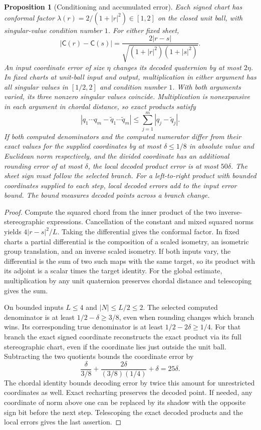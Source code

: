 \documentclass[11pt,reqno]{amsart}
\newtheorem{proposition}[theorem]{Proposition}
\theoremstyle{definition}
\theoremstyle{remark}
\numberwithin{equation}{section}
\newcommand{\Cay}{\mathsf{C}}
\begin{document}
\begin{proposition}[Conditioning and accumulated error]\label{m4:conditioning}
Each signed chart has conformal factor $\lambda(r)=2/(1+|r|^2)\in[1,2]$ on the closed unit ball, with singular-value condition number $1$. For either fixed sheet,
\[
 |\Cay(r)-\Cay(s)|=\frac{2|r-s|}{\sqrt{(1+|r|^2)(1+|s|^2)}}.
\]
An input coordinate error of size $\eta$ changes its decoded quaternion by at most $2\eta$. In fixed charts at unit-ball input and output, multiplication in either argument has all singular values in $[1/2,2]$ and condition number $1$. With both arguments varied, its three nonzero singular values coincide. Multiplication is nonexpansive in each argument in chordal distance, so exact products satisfy
\[
 |q_1\cdots q_m-\widetilde q_1\cdots\widetilde q_m|
 \le\sum_{j=1}^m|q_j-\widetilde q_j|.
\]
If both computed denominators and the computed numerator differ from their exact values for the supplied coordinates by at most $\delta\le1/8$ in absolute value and Euclidean norm respectively, and the divided coordinate has an additional rounding error of at most $\delta$, the local decoded product error is at most $50\delta$. The sheet sign must follow the selected branch. For a left-to-right product with bounded coordinates supplied to each step, local decoded errors add to the input error bound. The bound measures decoded points across a branch change.
\end{proposition}
\begin{proof}
Compute the squared chord from the inner product of the two inverse-stereographic expressions. Cancellation of the constant and mixed squared norms yields $4|r-s|^2/L$. Taking the differential gives the conformal factor. In fixed charts a partial differential is the composition of a scaled isometry, an isometric group translation, and an inverse scaled isometry. If both inputs vary, the differential is the sum of two such maps with the same target, so its product with its adjoint is a scalar times the target identity. For the global estimate, multiplication by any unit quaternion preserves chordal distance and telescoping gives the sum.

On bounded inputs $L\le4$ and $|N|\le L/2\le2$. The selected computed denominator is at least $1/2-\delta\ge3/8$, even when rounding changes which branch wins. Its corresponding true denominator is at least $1/2-2\delta\ge1/4$. For that branch the exact signed coordinate reconstructs the exact product via its full stereographic chart, even if the coordinate lies just outside the unit ball. Subtracting the two quotients bounds the coordinate error by
\[
 \frac{\delta}{3/8}+\frac{2\delta}{(3/8)(1/4)}+\delta=25\delta.
\]
The chordal identity bounds decoding error by twice this amount for unrestricted coordinates as well. Exact recharting preserves the decoded point. If needed, any coordinate of norm above one can be replaced by its shadow with the opposite sign bit before the next step. Telescoping the exact decoded products and the local errors gives the last assertion.
\end{proof}
\end{document}
